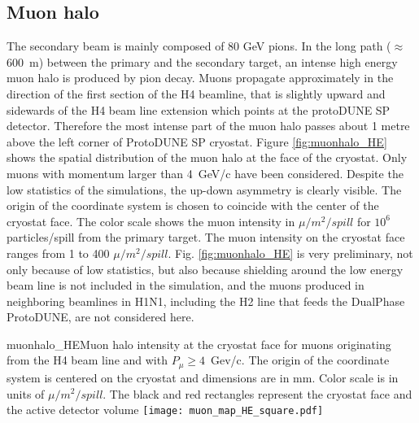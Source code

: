 \subsection{Muon halo}
The secondary beam is mainly composed of 80 GeV pions. In the long path ($\approx$ 600~m) between the primary and the secondary target,
 an intense high energy muon halo is produced by pion decay. Muons propagate approximately in the direction of the first section of the H4 beamline, 
 that is slightly upward  and sidewards of the H4 beam line extension which points at the protoDUNE SP detector.  
 Therefore the most intense part of the muon halo passes about 1  metre above the left corner of ProtoDUNE SP cryostat. 
Figure \ref{fig:muonhalo_HE} shows the spatial distribution of the muon halo at the face of the cryostat. Only muons with momentum larger than 4~GeV/c have been considered. Despite the low statistics of the simulations, the up-down asymmetry is clearly visible. The origin of the coordinate system is chosen to coincide with the center of the cryostat face. The color scale shows the muon intensity in $\mu /m^2/spill$ for $10^6$ particles/spill from the primary target. The muon intensity on the cryostat face ranges from 1 to 400  $\mu /m^2/spill$.
Fig. \ref{fig:muonhalo_HE}  is very preliminary, not only because of low statistics, but also because shielding around the low energy beam line is not included in the simulation, and the muons produced in neighboring beamlines in H1N1, including the H2 line that feeds the DualPhase ProtoDUNE, are not considered here. 
\begin{cdrfigure}{muonhalo_HE}{Muon halo intensity at the cryostat face for muons originating from the H4 beam line and with $P_\mu  \ge 4$~Gev/c. The origin of the coordinate system is centered on the cryostat and dimensions are in mm. Color scale is in units of $\mu /m^2/spill$. The black and red rectangles represent the cryostat face and the active detector volume}
\texttt{[image: muon\_map\_HE\_square.pdf]}
\end{cdrfigure}




